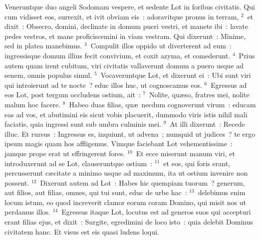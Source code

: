 \lettrine[lines=3,image=true,loversize=0.05,lraise=-0.03]{V}{}eneruntque duo angeli Sodomam vespere, et sedente Lot in foribus civitatis. Qui cum vidisset eos, surrexit, et ivit obviam eis~: adoravitque pronus in terram,
${}^{2}$~et dixit~: Obsecro, domini, declinate in domum pueri vestri, et manete ibi~: lavate pedes vestros, et mane proficiscemini in viam vestram. Qui dixerunt~: Minime, sed in platea manebimus.
${}^{3}$~Compulit illos oppido ut diverterent ad eum~: ingressisque domum illius fecit convivium, et coxit azyma, et comederunt.
${}^{4}$~Prius autem quam irent cubitum, viri civitatis vallaverunt domum a puero usque ad senem, omnis populus simul.
${}^{5}$~Vocaveruntque Lot, et dixerunt ei~: Ubi sunt viri qui introierunt ad te nocte~? educ illos huc, ut cognoscamus eos.
${}^{6}$~Egressus ad eos Lot, post tergum occludens ostium, ait~:
${}^{7}$~Nolite, qu\ae so, fratres mei, nolite malum hoc facere.
${}^{8}$~Habeo duas filias, qu\ae\ necdum cognoverunt virum~: educam eas ad vos, et abutimini eis sicut vobis placuerit, dummodo viris istis nihil mali faciatis, quia ingressi sunt sub umbra culminis mei.
${}^{9}$~At illi dixerunt~: Recede illuc. Et rursus~: Ingressus es, inquiunt, ut advena~; numquid ut judices~? te ergo ipsum magis quam hos affligemus. Vimque faciebant Lot vehementissime~: jamque prope erat ut effringerent fores.
${}^{10}$~Et ecce miserunt manum viri, et introduxerunt ad se Lot, clauseruntque ostium~:
${}^{11}$~et eos, qui foris erant, percusserunt c\ae citate a minimo usque ad maximum, ita ut ostium invenire non possent.
${}^{12}$~Dixerunt autem ad Lot~: Habes hic quempiam tuorum~? generum, aut filios, aut filias, omnes, qui tui sunt, educ de urbe hac~:
${}^{13}$~delebimus enim locum istum, eo quod increverit clamor eorum coram Domino, qui misit nos ut perdamus illos.
${}^{14}$~Egressus itaque Lot, locutus est ad generos suos qui accepturi erant filias ejus, et dixit~: Surgite, egredimini de loco isto~: quia delebit Dominus civitatem hanc. Et visus est eis quasi ludens loqui.


